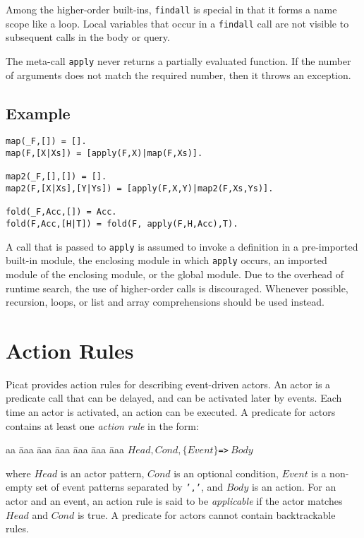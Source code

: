 Among the higher-order built-ins, \texttt{findall} is special in that it forms a name scope like a loop. Local variables that occur in a \texttt{findall} call are not visible to subsequent calls in the body or query.

The meta-call \texttt{apply} never returns a partially evaluated function. If the number of arguments does not match the required number, then it throws an exception.

\subsection*{Example}
\begin{verbatim}
map(_F,[]) = [].
map(F,[X|Xs]) = [apply(F,X)|map(F,Xs)].

map2(_F,[],[]) = [].
map2(F,[X|Xs],[Y|Ys]) = [apply(F,X,Y)|map2(F,Xs,Ys)].

fold(_F,Acc,[]) = Acc.
fold(F,Acc,[H|T]) = fold(F, apply(F,H,Acc),T).
\end{verbatim}

A call that is passed to \texttt{apply} is assumed to invoke a definition in a pre-imported built-in module, the enclosing module in which \texttt{apply} occurs, an imported module of the enclosing module, or the global module. Due to the overhead of runtime search, the use of higher-order calls is discouraged. Whenever possible, recursion, loops, or list and array comprehensions should be used instead.

\section{Action Rules}
Picat provides action rules for describing event-driven actors. An actor is a predicate call that can be delayed, and can be activated later by events. Each time an actor is activated, an action can be executed. A predicate for actors contains at least one \emph{action rule} in the form:
\begin{tabbing}
aa \= aaa \= aaa \= aaa \= aaa \= aaa \= aaa \kill
\> $Head, Cond, \{Event\} $\verb+=>+$\ Body$ 
\end{tabbing}
where $Head$ is an actor pattern, $Cond$ is an optional condition, $Event$ is a non-empty set of event patterns separated by \texttt{','},  and $Body$ is an action. For an actor and an event, an action rule is said to be \emph{applicable} if the actor matches $Head$ and $Cond$ is true. A predicate for actors cannot contain backtrackable rules.

